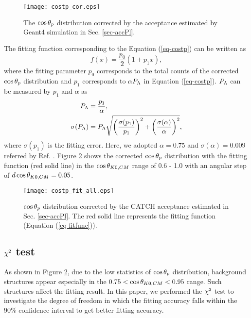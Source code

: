 \begin{figure}[h]
  \centering
  \texttt{[image: costp\_cor.eps]}
  \caption{The $\cos{\theta_p}$ distribution corrected by the acceptance estimated by Geant4 simulation in Sec. \ref{sec-accPl}.}
  \label{fig-costp_cor}
\end{figure}

The fitting function corresponding to the Equation (\ref{eq-costp}) can be written as
\begin{equation}
  f(x) = \frac{p_0}{2} (1+p_1x),
  \label{eq-fitfunc}
\end{equation}
where the fitting parameter $p_0$ corresponds to the total counts of the corrected $\cos{\theta_p}$ distribution and $p_1$ corresponds to $\alpha P_{\Lambda}$ in Equation (\ref{eq-costp}). $P_{\Lambda}$ can be measured by $p_1$ and $\alpha$ as
\begin{align}
  P_{\Lambda} &= \frac{p_1}{\alpha}, \label{eq-PL} \\
  \sigma(P_{\Lambda}) &= P_{\Lambda} \sqrt{ \left( \frac{\sigma(p_1)}{p_1} \right)^2 + \left( \frac{\sigma(\alpha)}{\alpha} \right)^2},
\end{align}
where $\sigma(p_1)$ is the fitting error. %
Here, we adopted $\alpha=0.75$ and $\sigma(\alpha)=0.009$ referred by Ref. \cite{Alpha}. Figure \ref{fig-costp_fit_all} shows the corrected $\cos{\theta_p}$ distribution with the fitting function (red solid line) in the $\cos{\theta_{K0,CM}}$ range of 0.6 - 1.0 with an angular step of $d\cos{\theta_{K0,CM}}=0.05$. 

\begin{figure}[h]
  \centering
  \texttt{[image: costp\_fit\_all.eps]}
  \caption{$\cos{\theta_p}$ distribution corrected by the CATCH acceptance estimated in Sec. \ref{sec-accPl}. The red solid line represents the fitting function (Equation (\ref{eq-fitfunc})).}
  \label{fig-costp_fit_all}
\end{figure}


\subsection{$\chi^{2}$ test}

As shown in Figure \ref{fig-costp_fit_all}, due to the low statistics of $\cos{\theta_p}$ distribution, background structures appear especially in the $0.75<\cos{\theta_{K0,CM}}<0.95$ range. Such structures affect the fitting result. In this paper, we performed the $\chi^{2}$ test to investigate the degree of freedom in which the fitting accuracy falls within the 90\% confidence interval to get better fitting accuracy. 

